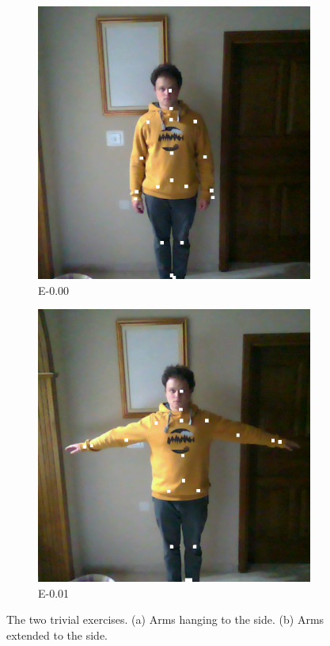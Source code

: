 \begin{figure}
  \centering
  \begin{subfigure}[b]{0.16\linewidth}
      \centering
      \includegraphics[width=\textwidth]{figures/samples/trivial/E-0.00_10.png}
      \caption[]{E-0.00}
  \end{subfigure}
  \hfill
  \begin{subfigure}[b]{0.16\linewidth}
      \centering
      \includegraphics[width=\textwidth]{figures/samples/trivial/E-0.01_38.png}
      \caption[]{E-0.01}
  \end{subfigure}
  \caption[Trivial Exercises]{The two trivial exercises. (a) Arms hanging to the side. (b) Arms extended to the side.}
  \label{fig:trivial_exercises}
\end{figure}  

